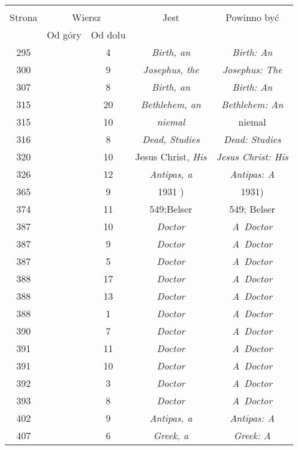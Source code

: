 \documentclass[a4paper,11pt]{article}
\begin{document}
\begin{center}
  \begin{tabular}{|c|c|c|c|c|}
    \hline
    & \multicolumn{2}{c|}{} & & \\
    Strona & \multicolumn{2}{c|}{Wiersz} & Jest
                              & Powinno być \\ \cline{2-3}
    & Od góry & Od dołu & & \\
    \hline
    295 & &  4 & \emph{Birth, an} & \emph{Birth: An} \\
    300 & &  9 & \emph{Josephus, the} & \emph{Josephus: The} \\
    307 & &  8 & \emph{Birth, an} & \emph{Birth: An} \\
    315 & & 20 & \emph{Bethlehem, an} & \emph{Bethlehem: An} \\
    315 & & 10 & \emph{niemal} & niemal \\
    316 & &  8 & \emph{Dead, Studies} & \emph{Dead: Studies} \\
    320 & & 10 & Jesus Christ, \emph{His} & \emph{Jesus Christ: His} \\
    326 & & 12 & \emph{Antipas, a} & \emph{Antipas: A} \\
    365 & &  9 & 1931 ) & 1931) \\
    374 & & 11 & 549;Belser & 549; Belser \\
    387 & & 10 & \emph{Doctor} & \emph{A~Doctor} \\
    387 & &  9 & \emph{Doctor} & \emph{A~Doctor} \\
    387 & &  5 & \emph{Doctor} & \emph{A~Doctor} \\
    388 & & 17 & \emph{Doctor} & \emph{A~Doctor} \\
    388 & & 13 & \emph{Doctor} & \emph{A~Doctor} \\
    388 & &  1 & \emph{Doctor} & \emph{A~Doctor} \\
    390 & &  7 & \emph{Doctor} & \emph{A~Doctor} \\
    391 & & 11 & \emph{Doctor} & \emph{A~Doctor} \\
    391 & & 10 & \emph{Doctor} & \emph{A~Doctor} \\
    392 & &  3 & \emph{Doctor} & \emph{A~Doctor} \\
    393 & &  8 & \emph{Doctor} & \emph{A~Doctor} \\
    402 & &  9 & \emph{Antipas, a} & \emph{Antipas: A }\\
    407 & &  6 & \emph{Greek, a} & \emph{Greek: A} \\

\end{tabular}
\end{center}
\end{document}

